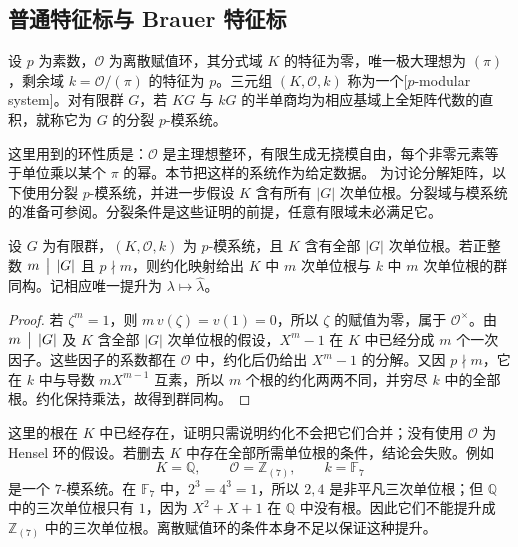 \subsection{普通特征标与 Brauer 特征标}
\label{b5:subsec:0803:02}

\begin{definition}\label{b5:def:p-modular-system}
	设 \(p\) 为素数，\(\mathcal O\) 为离散赋值环，其分式域 \(K\) 的特征为零，唯一极大理想为 \((\pi)\)，剩余域 \(k=\mathcal O/(\pi)\) 的特征为 \(p\)。三元组 \((K,\mathcal O,k)\) 称为一个[\(p\)-modular system]。对有限群 \(G\)，若 \(KG\) 与 \(kG\) 的半单商均为相应基域上全矩阵代数的直积，就称它为 \(G\) 的分裂 \(p\)-模系统。
\end{definition}
这里用到的环性质是：\(\mathcal O\) 是主理想整环，有限生成无挠模自由，每个非零元素等于单位乘以某个 \(\pi\) 的幂。本节把这样的系统作为给定数据。
\ProseParagraphBreak
为讨论分解矩阵，以下使用分裂 \(p\)-模系统，并进一步假设 \(K\) 含有所有 \(|G|\) 次单位根。分裂域与模系统的准备可参阅\cite[Section 9.2, Theorem 9.2.6; Section 9.4]{Webb2016FiniteGroupRepresentations}。分裂条件是这些证明的前提，任意有限域未必满足它。
\begin{lemma}\label{b5:lem:prime-to-p-root-lift}
	设 \(G\) 为有限群，\((K,\mathcal O,k)\) 为 \(p\)-模系统，且 \(K\) 含有全部 \(|G|\) 次单位根。若正整数 \(m\,\bigm\vert\,|G|\) 且 \(p\nmid m\)，则约化映射给出 \(K\) 中 \(m\) 次单位根与 \(k\) 中 \(m\) 次单位根的群同构。记相应唯一提升为 \(\lambda\mapsto\widehat\lambda\)。
\end{lemma}
\begin{proof}
	若 \(\zeta^m=1\)，则 \(m\,v(\zeta)=v(1)=0\)，所以 \(\zeta\) 的赋值为零，属于 \(\mathcal O^\times\)。由 \(m\,\bigm\vert\,|G|\) 及 \(K\) 含全部 \(|G|\) 次单位根的假设，\(X^m-1\) 在 \(K\) 中已经分成 \(m\) 个一次因子。这些因子的系数都在 \(\mathcal O\) 中，约化后仍给出 \(X^m-1\) 的分解。又因 \(p\nmid m\)，它在 \(k\) 中与导数 \(mX^{m-1}\) 互素，所以 \(m\) 个根的约化两两不同，并穷尽 \(k\) 中的全部根。约化保持乘法，故得到群同构。
\end{proof}
这里的根在 \(K\) 中已经存在，证明只需说明约化不会把它们合并；没有使用 \(\mathcal O\) 为 Hensel 环的假设。若删去 \(K\) 中存在全部所需单位根的条件，结论会失败。例如
\[
	K=\mathbb Q,\qquad \mathcal O=\mathbb Z_{(7)},\qquad k=\mathbb F_7
\]
是一个 \(7\)-模系统。在 \(\mathbb F_7\) 中，\(2^3=4^3=1\)，所以 \(2,4\) 是非平凡三次单位根；但 \(\mathbb Q\) 中的三次单位根只有 \(1\)，因为 \(X^2+X+1\) 在 \(\mathbb Q\) 中没有根。因此它们不能提升成 \(\mathbb Z_{(7)}\) 中的三次单位根。离散赋值环的条件本身不足以保证这种提升。

